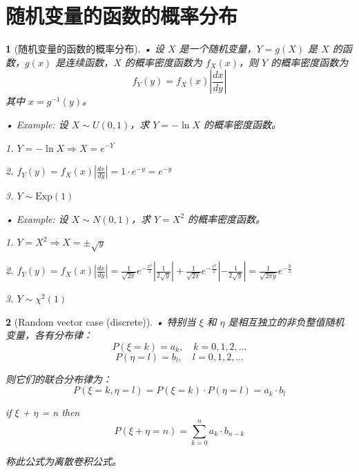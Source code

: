 \documentclass[UTF8]{report}
\theoremstyle{MyLineTheoremStyle} %
\theoremstyle{MyBlockTheoremStyle} %
\theoremstyle{MySubsubsectionStyle} %
\newtheorem{definition}{}
\begin{document}
\section{随机变量的函数的概率分布}

\begin{definition}[随机变量的函数的概率分布]
    • 设 \(X\) 是一个随机变量，\(Y = g(X)\) 是 \(X\) 的函数，\(g(x)\) 是连续函数，\(X\) 的概率密度函数为 \(f_X(x)\)，则 \(Y\) 的概率密度函数为
    \[
    f_Y(y) = f_X(x) \left| \frac{dx}{dy} \right|
    \]
    其中 \(x = g^{-1}(y)\)。\par
    • Example: 设 \(X \sim U(0, 1)\)，求 \(Y = -\ln X\) 的概率密度函数。\par
    1. \(Y = -\ln X \Rightarrow X = e^{-Y}\)\par
    2. \(f_Y(y) = f_X(x) \left| \frac{dx}{dy} \right| = 1 \cdot e^{-y} = e^{-y}\)\par
    3. \(Y \sim \text{Exp}(1)\)\par
    • Example: 设 \(X \sim N(0, 1)\)，求 \(Y = X^2\) 的概率密度函数。\par
    1. \(Y = X^2 \Rightarrow X = \pm \sqrt{y}\)\par
    2. \(f_Y(y) = f_X(x) \left| \frac{dx}{dy} \right| = \frac{1}{\sqrt{2\pi}} e^{-\frac{x^2}{2}} \left| \frac{1}{2\sqrt{y}} \right| + \frac{1}{\sqrt{2\pi}} e^{-\frac{x^2}{2}} \left| -\frac{1}{2\sqrt{y}} \right| = \frac{1}{\sqrt{2\pi y}} e^{-\frac{y}{2}}\)\par
    3. \(Y \sim \chi^2(1)\)
\end{definition}

\begin{definition}[Random vector case (discrete)]
    • 特别当 \(\xi\) 和 \(\eta\) 是相互独立的非负整值随机变量，各有分布律：
    \[
    P(\xi = k) = a_k, \quad k = 0, 1, 2, \ldots
    \]
    \[
    P(\eta = l) = b_l, \quad l = 0, 1, 2, \ldots
    \]\par
    则它们的联合分布律为：
    \[
    P(\xi = k, \eta = l) = P(\xi = k) \cdot P(\eta = l) = a_k \cdot b_l
    \]\par
    if \(\xi\) + \(\eta\) = n then
    \[
    P(\xi + \eta = n) = \sum_{k=0}^{n}a_k \cdot b_{n - k}
    \] \par
    称此公式为离散卷积公式。
\end{definition}
\end{document}
